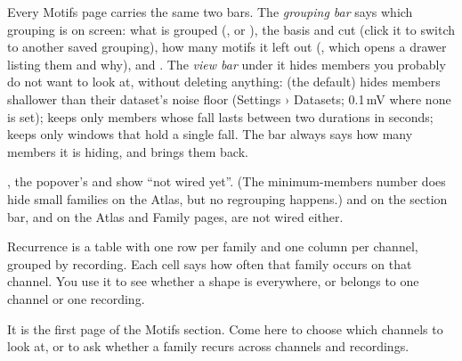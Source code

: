 Every Motifs page carries the same two bars. The \emph{grouping bar} says which grouping is on
screen: what is grouped (,  or ), the basis
and cut (click it to switch to another saved grouping), how many motifs it left out
(, which opens a drawer listing them and why), and .
The \emph{view bar} under it hides members you probably do not want to look at, without
deleting anything:  (the default) hides members shallower than their
dataset's noise floor (Settings › Datasets; 0.1\,mV where none is set);  keeps
only members whose fall lasts between two durations in seconds;  keeps only
windows that hold a single fall. The bar always says how many members it is hiding, and
 brings them back.

\begin{watchout}
, the  popover's  and  show
``not wired yet''. (The minimum-members number does hide small families on the Atlas, but no
regrouping happens.)  and  on the section bar, and
 on the Atlas and Family pages, are not wired either.
\end{watchout}

Recurrence is a table with one row per family and one column per channel, grouped by
recording. Each cell says how often that family occurs on that channel. You use it to see
whether a shape is everywhere, or belongs to one channel or one recording.

It is the first page of the Motifs section. Come here to choose which channels to look at, or
to ask whether a family recurs across channels and recordings.


